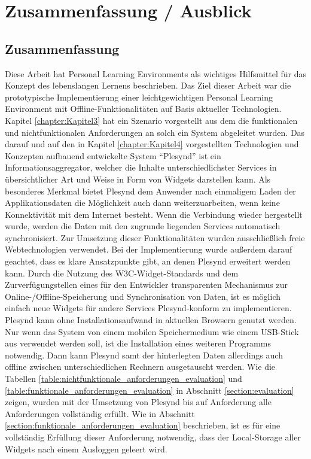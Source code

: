 \chapter{Zusammenfassung / Ausblick} 
\label{chapter:Kapitel7}

\section{Zusammenfassung}
Diese Arbeit hat Personal Learning Environments als wichtiges Hilfsmittel für das Konzept des lebenslangen Lernens beschrieben. Das Ziel dieser Arbeit war die prototypische Implementierung einer leichtgewichtigen Personal Learning Environment mit Offline-Funktionalitäten auf Basis aktueller Technologien. Kapitel \ref{chapter:Kapitel3} hat ein Szenario vorgestellt aus dem die funktionalen und nichtfunktionalen Anforderungen an solch ein System abgeleitet wurden. Das darauf und auf den in Kapitel \ref{chapter:Kapitel4} vorgestellten Technologien und Konzepten aufbauend entwickelte System "`Plesynd"' ist ein Informationsaggregator, welcher die Inhalte unterschiedlichster Services in übersichtlicher Art und Weise in Form von Widgets darstellen kann. Als besonderes Merkmal bietet Plesynd dem Anwender nach einmaligem Laden der Applikationsdaten die Möglichkeit auch dann weiterzuarbeiten, wenn keine Konnektivität mit dem Internet besteht. Wenn die Verbindung wieder hergestellt wurde, werden die Daten mit den zugrunde liegenden Services automatisch synchronisiert. Zur Umsetzung dieser Funktionalitäten wurden ausschließlich freie Webtechnologien verwendet. Bei der Implementierung wurde außerdem darauf geachtet, dass es klare Ansatzpunkte gibt, an denen Plesynd erweitert werden kann. Durch die Nutzung des W3C-Widget-Standards und dem Zurverfügungstellen eines für den Entwickler transparenten Mechanismus zur Online-/Offline-Speicherung und Synchronisation von Daten, ist es möglich einfach neue Widgets für andere Services Plesynd-konform zu implementieren. Plesynd kann ohne Installationsaufwand in aktuellen Browsern genutzt werden. Nur wenn das System von einem mobilen Speichermedium wie einem USB-Stick aus verwendet werden soll, ist die Installation eines weiteren Programms notwendig. Dann kann Plesynd samt der hinterlegten Daten allerdings auch offline zwischen unterschiedlichen Rechnern ausgetauscht werden.  Wie die Tabellen \ref{table:nichtfunktionale_anforderungen_evaluation} und \ref{table:funktionale_anforderungen_evaluation} in Abschnitt \ref{section:evaluation} zeigen, wurden mit der Umsetzung von Plesynd bis auf Anforderung  alle Anforderungen vollständig erfüllt. Wie in Abschnitt \ref{section:funktionale_anforderungen_evaluation} beschrieben, ist es für eine vollständig Erfüllung dieser Anforderung notwendig, dass der Local-Storage aller Widgets nach einem Ausloggen geleert wird. 

